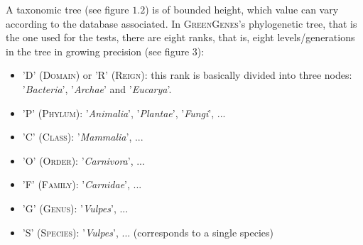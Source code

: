\documentclass{report}
\begin{document}
A taxonomic tree (see figure $1.2$) is of bounded height, which value can vary according to the database associated. In \textsc{GreenGenes}'s phylogenetic tree, that is the one used for the tests, there are eight ranks, that is, eight levels/generations in the tree in growing precision (see figure $3$):
\begin{itemize}
\item 'D' (\textsc{Domain}) or 'R' (\textsc{Reign}): this rank is basically divided into three nodes: '\emph{Bacteria}', '\emph{Archae}' and '\emph{Eucarya}'.
\item 'P' (\textsc{Phylum}): '\emph{Animalia}', '\emph{Plantae}', '\emph{Fungi}', ...
\item 'C' (\textsc{Class}): '\emph{Mammalia}', ...
\item 'O' (\textsc{Order}): '\emph{Carnivora}', ...
\item 'F' (\textsc{Family}): '\emph{Carnidae}', ...
\item 'G' (\textsc{Genus}): '\emph{Vulpes}', ...
\item 'S' (\textsc{Species}): '\emph{Vulpes}', ... (corresponds to a single species)
\end{itemize} 
\end{document}
